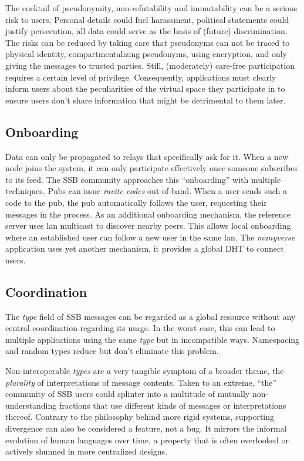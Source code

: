 \documentclass[10pt,sigconf,rewiew]{acmart}
\begin{document}
The cocktail of pseudonymity, non-refutability and immutability can be a serious risk to users. Personal details could fuel harassment, political statements could justify persecution, all data could serve as the basis of (future) discrimination. The risks can be reduced by taking care that pseudonyms can not be traced to physical identity, compartmentalizing pseudonyms, using encryption, and only giving the messages to trusted parties. Still, (moderately) care-free participation requires a certain level of privilege. Consequently, applications must clearly inform users about the peculiarities of the virtual space they participate in to ensure users don't share information that might be detrimental to them later.

\subsection{Onboarding}

Data can only be propagated to relays that specifically ask for it. When a new node joins the system, it can only participate effectively once someone subscribes to its feed. The SSB community approaches this ``onboarding'' with multiple techniques. Pubs can issue \textit{invite codes} out-of-band. When a user sends such a code to the pub, the pub automatically follows the user, requesting their messages in the process. As an additional onboarding mechanism, the reference server uses lan multicast to discover nearby peers. This allows local onboarding where an established user can follow a new user in the same lan. The \textit{manyverse} application uses yet another mechanism, it provides a global DHT to connect users.

\subsection{Coordination}

The \textit{type} field of SSB messages can be regarded as a global resource without any central coordination regarding its usage. In the worst case, this can lead to multiple applications using the same \textit{type} but in incompatible ways. Namespacing and random types reduce but don't eliminate this problem.

Non-interoperable \textit{types} are a very tangible symptom of a broader theme, the \textit{plurality} of interpretations of message contents. Taken to an extreme, ``the'' community of SSB users could splinter into a multitude of mutually non-understanding fractions that use different kinds of messages or interpretations thereof. Contrary to the philosophy behind more rigid systems, supporting divergence can also be considered a feature, not a bug. It mirrors the informal evolution of human languages over time, a property that is often overlooked or actively shunned in more centralized designs.
\end{document}
